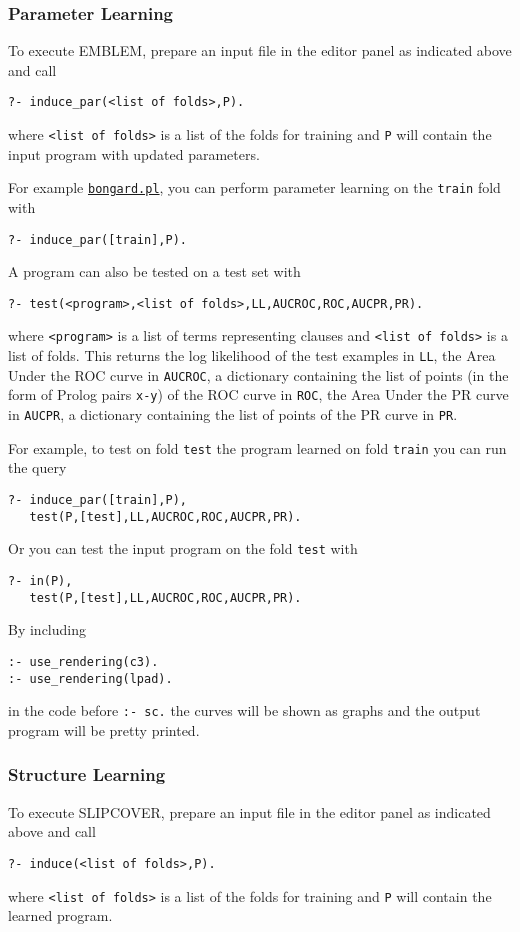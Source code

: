 \documentclass[a4paper,10pt]{article}
\begin{document}
\subsubsection{Parameter Learning}
To execute EMBLEM, prepare an input file in the editor panel as indicated above 
and call
\begin{verbatim}
?- induce_par(<list of folds>,P).
\end{verbatim}
where \verb|<list of folds>| is a list of the folds for training and
\verb|P| will contain the input program with updated parameters.

For example \href{http://cplint.lamping.unife.it/example/bongard.pl}{\texttt{bongard.pl}}, you can 
perform parameter learning on the \verb|train| fold with 
\begin{verbatim}
?- induce_par([train],P).
\end{verbatim}
A program can also be tested on a test set with
\begin{verbatim}
?- test(<program>,<list of folds>,LL,AUCROC,ROC,AUCPR,PR).
\end{verbatim}
where \verb|<program>| is a list of terms representing clauses and
\verb|<list of folds>| is a list of folds.
This returns the log likelihood of the test examples in \verb|LL|, the Area Under the ROC curve in \verb|AUCROC|, a dictionary containing the list of points (in the form of Prolog pairs \verb|x-y|) of the ROC curve in \verb|ROC|,
the Area Under the PR curve in \verb|AUCPR|, a dictionary containing the list of points of the PR curve in \verb|PR|.

For example, to test on fold \verb|test| the program learned on fold \verb|train| you can run the query
\begin{verbatim}
?- induce_par([train],P),
   test(P,[test],LL,AUCROC,ROC,AUCPR,PR).
\end{verbatim}
Or you can test the input program on the fold \verb|test| with
\begin{verbatim}
?- in(P),
   test(P,[test],LL,AUCROC,ROC,AUCPR,PR).
\end{verbatim}
By including
\begin{verbatim}
:- use_rendering(c3).
:- use_rendering(lpad).
\end{verbatim}
in the code before \verb|:- sc.| the curves will be shown as graphs and the output program will be pretty printed.



\subsubsection{Structure Learning}
To execute SLIPCOVER,
prepare an input file in the editor panel as indicated above 
and call
\begin{verbatim}
?- induce(<list of folds>,P).
\end{verbatim}
where \verb|<list of folds>| is a list of the folds for training and
\verb|P| will contain the learned program.
\end{document}
